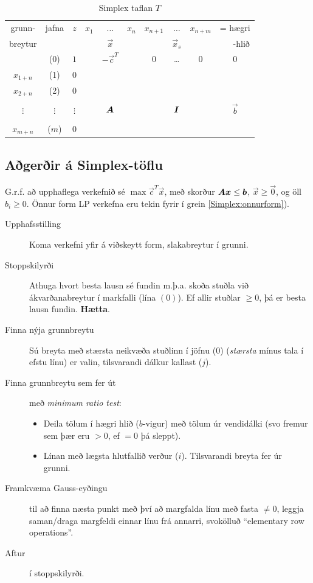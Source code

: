 \begin{table}[h!]\centering
{
\begin{tabular}{|c|c|c|ccc|ccc|c|}
\hline
grunn- & jafna & $z$ & $x_1$ & $\ldots$ & $x_n$ & $x_{n+1}$ &
$\ldots$ & $x_{n+m}$ & = hægri\\
breytur & & & &$\vec{x}$ & & & $\vec{x}_s$& & ~~~-hlið\\
\hline
 & (0) & $1$ &       & $-\vec{c}^T$ & & 0 & \ldots & 0 & 0 \\
\hline
$x_{1+n}$ & (1) & 0 & & & & & & & \\
$x_{2+n}$ & (2) & 0 & & & & & & & \\
 &  &  & & & & & & & \\
$\vdots$ & $\vdots$ & $\vdots$ & & ${\mbox{\boldmath$A$}}$ & & &${\mbox{\boldmath$I$}}$ & & $\vec{b}$ \\
 &  &  & & & & & & & \\
$x_{m+n}$ & ($m$) & 0 & & & & & & & \\
\hline
\end{tabular}}
\caption{Simplex taflan $T$}\label{table:simplex}
\end{table}
 \newpage
\subsection{Aðgerðir á Simplex-töflu}
\begin{aths}G.r.f. að upphaflega verkefnið sé $\max \vec{c}^T\vec{x}$, með skorður ${\mbox{\boldmath$A$}}{\mbox{\boldmath$x$}}\leq{\mbox{\boldmath$b$}}$, $\vec{x}\geq\vec{0}$, og öll $b_i\geq0$. Önnur form LP verkefna eru tekin fyrir í grein \ref{Simplex:onnurform}).\end{aths}
\begin{description}
\item[Upphafsstilling] Koma verkefni yfir á viðskeytt form, slakabreytur í grunni.
 \item[Stoppskilyrði] Athuga hvort besta lausn sé fundin m.þ.a. skoða stuðla við ákvarðana\-breytur í markfalli (lína $(0)$). Ef allir stuðlar $\geq0$, þá er besta lausn fundin. {\bf Hætta}.\label{itrun:simplex}
\item[Finna nýja grunnbreytu] Sú breyta  með stærsta neikvæða stuðlinn í jöfnu (0) (\emph{stærsta} mínus tala í
 efstu línu) er valin, tilsvarandi dálkur kallast  ($j$). 
\item[Finna grunnbreytu sem fer út] með \emph{minimum ratio test}:
\begin{itemize}
 \item Deila tölum í hægri hlið ($b$-vigur) með tölum úr vendidálki (svo fremur sem þær eru $>0$, ef $=0$ þá sleppt).
 \item Línan með lægsta hlutfallið verður  ($i$). Tilsvarandi breyta fer úr grunni.
\end{itemize}
\item[Framkvæma Gauss-eyðingu] til að finna næsta punkt með því að marg\-falda línu með fasta $\neq0$, leggja saman/draga margfeldi einnar línu frá annarri, svokölluð ``elementary row operations''.
\item[Aftur] í stoppskilyrði.
\end{description}

